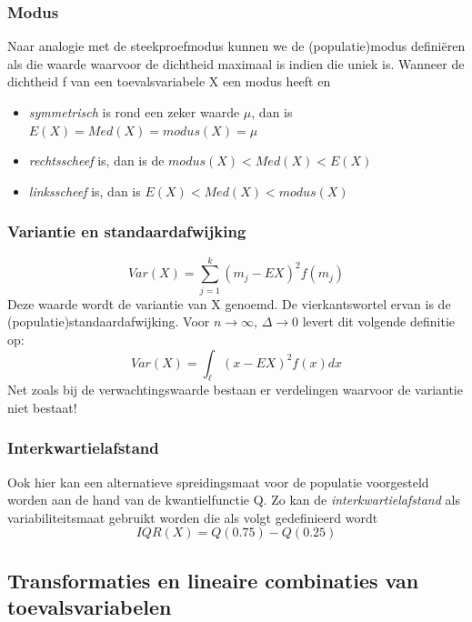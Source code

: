\documentclass[titlepage]{article}
\numberwithin{equation}{section}
\begin{document}
 \subsubsection{Modus}
 Naar analogie met de steekproefmodus kunnen we de (populatie)modus definiëren als die waarde waarvoor de dichtheid maximaal is indien die uniek is.\newline\newline
 Wanneer de dichtheid f van een toevalsvariabele X een modus heeft en
 \begin{itemize}
 	\item \textit{symmetrisch} is rond een zeker waarde $\mu$, dan is \\ $E(X) = Med(X) = modus(X) = \mu$
 	\item \textit{rechtsscheef} is, dan is de $modus(X) < Med(X) < E(X)$
 	\item \textit{linksscheef} is, dan is $E(X)<Med(X)<modus(X)$
 \end{itemize}
 \subsubsection{Variantie en standaardafwijking}
 \begin{equation}
 	Var(X) = \sum\limits_{j=1}^k (m_j - EX)^2 f(m_j)
 	\label{3.24}
 \end{equation}
 Deze waarde wordt de variantie van X genoemd. De vierkantswortel ervan is de (populatie)standaardafwijking.\newline\newline
 Voor $n \rightarrow \infty$, $\Delta\rightarrow 0$ levert dit volgende definitie op:
 \begin{equation}
 	Var(X) = \int_\ell (x-EX)^2 f(x) dx
 	\label{3.25}
 \end{equation} 
 \danger Net zoals bij de verwachtingswaarde bestaan er verdelingen waarvoor de variantie niet bestaat!
 \subsubsection{Interkwartielafstand}
 Ook hier kan een alternatieve spreidingsmaat voor de populatie voorgesteld worden aan de hand van de kwantielfunctie Q. Zo kan de \textit{interkwartielafstand} als variabiliteitsmaat gebruikt worden die als volgt gedefinieerd wordt
 \begin{equation}
 	IQR(X) = Q(0.75)-Q(0.25)
 	\label{3.26}
 \end{equation}
 \subsection{Transformaties en lineaire combinaties van toevalsvariabelen}
\end{document}

